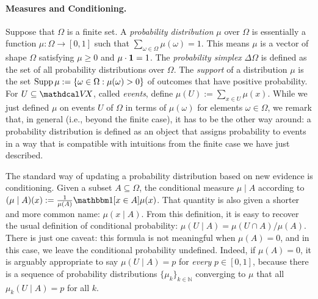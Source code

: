 \paragraph{Measures and Conditioning.}
Suppose that $\Omega$ is a finite set. 
A \emph{probability distribution} $\mu$ over $\Omega$ is essentially a function 
$\mu : \Omega \to [0,1]$ such that $\sum_{\omega \in \Omega} \mu(\omega) = 1$.
This means $\mu$ is a vector of shape 
$\Omega$ 
satisfying $\mu \ge 0$ and $\mu \cdot \mathbf 1 = 1$. 
The \emph{probability simplex} $\Delta \Omega$ is defined as the set of all probability distributions over $\Omega$. 
The \emph{support} of a distribution $\mu$
    is the set $\operatorname{\mathrm{Supp}} \mu := \{ \omega \in \Omega : \mu(\omega) > 0 \}$
    of outcomes that have positive probability.
For $U \subseteq \V\!X$, called \emph{events},
    define $\mu(U) := \sum_{x \in U} \mu(x)$. 
While we just defined $\mu$ on events $U$ of $\Omega$ in terms of $\mu(\omega)$ for elements $\omega \in \Omega$, we remark that, in general (i.e., beyond the finite case), it has to be the other way around: a probability distribution is defined as an object that assigns probability to events in a way that is compatible with intuitions from the finite case we have just described.


The standard way of updating a probability distribution based on new evidence is conditioning. Given a subset $A \subseteq \Omega$, the conditional measure
$\mu \mid A$ according to 
$(\mu \mid A)(x) := \frac{1}{\mu(A)} \mathbbm 1[x \in A] \mu(x)$.
That quantity is also given a shorter and more common name: $\mu(x \mid A)$. 
From this definition, it is easy to recover the usual definition of conditional probability:
$\mu(U \mid A) = \mu(U \cap A) / \mu(A)$. 
There is just one caveat: this formula is not meaningful when $\mu(A) = 0$, and in this case, we leave the conditional probability undefined.
Indeed, if $\mu(A) = 0$, it is arguably appropriate to say $\mu(U \mid A) = p$ for \emph{every} $p\in[0,1]$, because there is a sequence of probability distributions $\{ \mu_k \}_{k \in \mathbb N}$ converging to $\mu$ that all $\mu_k(U \mid A) = p$ for all $k$. 

